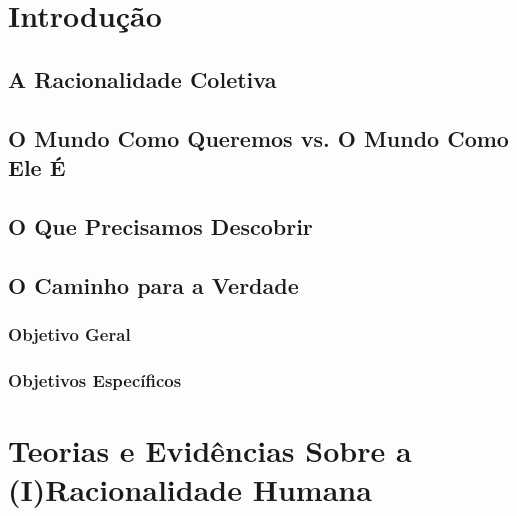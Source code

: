 

\chapter{Introdução} %







\section{A Racionalidade Coletiva} %




\section{O Mundo Como Queremos vs. O Mundo Como Ele É} %



\section{O Que Precisamos Descobrir} %





\section{O Caminho para a Verdade} %




\subsection{Objetivo Geral} %




\subsection{Objetivos Específicos} %





\chapter{Teorias e Evidências Sobre a (I)Racionalidade Humana} %




